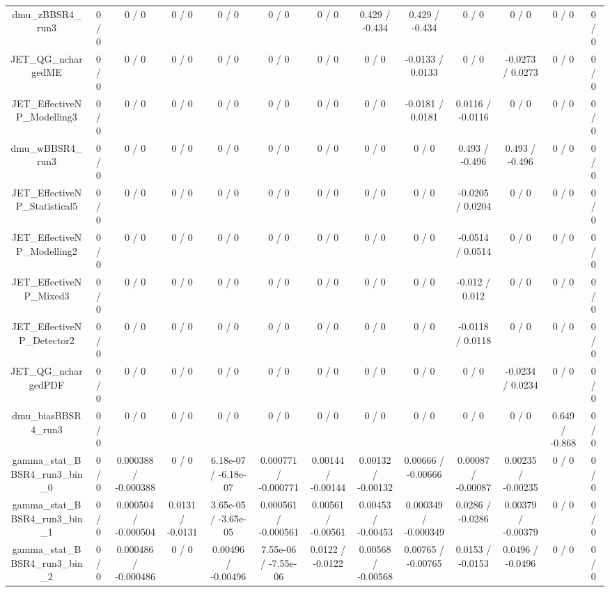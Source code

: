 \documentclass[10pt]{article}
\begin{document}
\begin{table}[htbp]
\begin{center}
\begin{tabular}{|c|c|c|c|c|c|c|c|c|c|c|c|c|}
  dmu_zBBSR4_run3 & 0 / 0 & 0 / 0 & 0 / 0 & 0 / 0 & 0 / 0 & 0 / 0 & 0.429 / -0.434 & 0.429 / -0.434 & 0 / 0 & 0 / 0 & 0 / 0 & 0 / 0 \\ 
  JET_QG_nchargedME & 0 / 0 & 0 / 0 & 0 / 0 & 0 / 0 & 0 / 0 & 0 / 0 & 0 / 0 & -0.0133 / 0.0133 & 0 / 0 & -0.0273 / 0.0273 & 0 / 0 & 0 / 0 \\ 
  JET_EffectiveNP_Modelling3 & 0 / 0 & 0 / 0 & 0 / 0 & 0 / 0 & 0 / 0 & 0 / 0 & 0 / 0 & -0.0181 / 0.0181 & 0.0116 / -0.0116 & 0 / 0 & 0 / 0 & 0 / 0 \\ 
  dmu_wBBSR4_run3 & 0 / 0 & 0 / 0 & 0 / 0 & 0 / 0 & 0 / 0 & 0 / 0 & 0 / 0 & 0 / 0 & 0.493 / -0.496 & 0.493 / -0.496 & 0 / 0 & 0 / 0 \\ 
  JET_EffectiveNP_Statistical5 & 0 / 0 & 0 / 0 & 0 / 0 & 0 / 0 & 0 / 0 & 0 / 0 & 0 / 0 & 0 / 0 & -0.0205 / 0.0204 & 0 / 0 & 0 / 0 & 0 / 0 \\ 
  JET_EffectiveNP_Modelling2 & 0 / 0 & 0 / 0 & 0 / 0 & 0 / 0 & 0 / 0 & 0 / 0 & 0 / 0 & 0 / 0 & -0.0514 / 0.0514 & 0 / 0 & 0 / 0 & 0 / 0 \\ 
  JET_EffectiveNP_Mixed3 & 0 / 0 & 0 / 0 & 0 / 0 & 0 / 0 & 0 / 0 & 0 / 0 & 0 / 0 & 0 / 0 & -0.012 / 0.012 & 0 / 0 & 0 / 0 & 0 / 0 \\ 
  JET_EffectiveNP_Detector2 & 0 / 0 & 0 / 0 & 0 / 0 & 0 / 0 & 0 / 0 & 0 / 0 & 0 / 0 & 0 / 0 & -0.0118 / 0.0118 & 0 / 0 & 0 / 0 & 0 / 0 \\ 
  JET_QG_nchargedPDF & 0 / 0 & 0 / 0 & 0 / 0 & 0 / 0 & 0 / 0 & 0 / 0 & 0 / 0 & 0 / 0 & 0 / 0 & -0.0234 / 0.0234 & 0 / 0 & 0 / 0 \\ 
  dmu_biasBBSR4_run3 & 0 / 0 & 0 / 0 & 0 / 0 & 0 / 0 & 0 / 0 & 0 / 0 & 0 / 0 & 0 / 0 & 0 / 0 & 0 / 0 & 0.649 / -0.868 & 0 / 0 \\ 
  gamma_stat_BBSR4_run3_bin_0 & 0 / 0 & 0.000388 / -0.000388 & 0 / 0 & 6.18e-07 / -6.18e-07 & 0.000771 / -0.000771 & 0.00144 / -0.00144 & 0.00132 / -0.00132 & 0.00666 / -0.00666 & 0.00087 / -0.00087 & 0.00235 / -0.00235 & 0 / 0 & 0 / 0 \\ 
  gamma_stat_BBSR4_run3_bin_1 & 0 / 0 & 0.000504 / -0.000504 & 0.0131 / -0.0131 & 3.65e-05 / -3.65e-05 & 0.000561 / -0.000561 & 0.00561 / -0.00561 & 0.00453 / -0.00453 & 0.000349 / -0.000349 & 0.0286 / -0.0286 & 0.00379 / -0.00379 & 0 / 0 & 0 / 0 \\ 
  gamma_stat_BBSR4_run3_bin_2 & 0 / 0 & 0.000486 / -0.000486 & 0 / 0 & 0.00496 / -0.00496 & 7.55e-06 / -7.55e-06 & 0.0122 / -0.0122 & 0.00568 / -0.00568 & 0.00765 / -0.00765 & 0.0153 / -0.0153 & 0.0496 / -0.0496 & 0 / 0 & 0 / 0 \\ 

\end{tabular}
\end{center}
\end{table}
\end{document}
